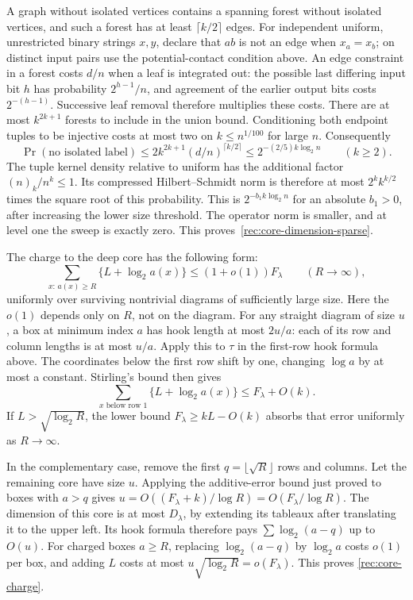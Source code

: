 A graph without isolated vertices contains a spanning forest without
isolated vertices, and such a forest has at least $\lceil k/2\rceil$
edges.  For independent uniform, unrestricted binary strings $x,y$, declare
that $ab$ is not an edge when $x_a=x_b$; on distinct input pairs use
the potential-contact condition above.  An edge constraint in a forest costs $d/n$ when a leaf is integrated out:
the possible last differing input bit $h$ has probability $2^{h-1}/n$,
and agreement of the earlier output bits costs $2^{-(h-1)}$.
Successive leaf removal therefore multiplies these costs.  There are
at most $k^{2k+1}$ forests to include in the union bound.  Conditioning
both endpoint tuples to be injective costs at most two on
$k\le n^{1/100}$ for large $n$.  Consequently
\[
 \Pr(\text{no isolated label})
 \le2k^{2k+1}(d/n)^{\lceil k/2\rceil}
 \le2^{-(2/5)k\log_2n}\qquad(k\ge2).
\]
The tuple kernel density relative to uniform has the additional factor
$(n)_k/n^k\le1$.  Its compressed Hilbert--Schmidt norm is therefore
at most $2^kk^{k/2}$ times the square root of this probability.
This is $2^{-b_1k\log_2n}$ for an absolute $b_1>0$, after increasing
the lower size threshold.  The operator norm is smaller, and at level
one the sweep is exactly zero.  This proves~\eqref{rec:core-dimension-sparse}.

The charge to the deep core has the following form:
\begin{equation}\label{rec:core-charge}
 \sum_{x:\,a(x)\ge R}\{L+\log_2 a(x)\}
 \le(1+o(1))F_\lambda\qquad(R\longrightarrow\infty),
\end{equation}
uniformly over surviving nontrivial diagrams of sufficiently large size.
Here the $o(1)$ depends only on $R$, not on the diagram.
For any straight diagram of size $u$, a box at minimum index $a$ has
hook length at most $2u/a$: each of its row and column lengths is at
most $u/a$.  Apply this to $\tau$ in the first-row hook formula
above.  The coordinates below the first row shift by one, changing
$\log a$ by at most a constant.  Stirling's bound then gives
\[
 \sum_{x\text{ below row }1}\{L+\log_2a(x)\}
 \le F_\lambda+O(k).
\]
If $L>\sqrt{\log_2R}$, the lower bound
$F_\lambda\ge kL-O(k)$ absorbs that error uniformly as $R\to\infty$.

In the complementary case, remove the first
$q=\lfloor\sqrt R\rfloor$ rows and columns.  Let the remaining core
have size $u$.  Applying the additive-error bound just proved to boxes
with $a>q$ gives
$u=O((F_\lambda+k)/\log R)=O(F_\lambda/\log R)$.
The dimension of this core is at most $D_\lambda$, by extending its
tableaux after translating it to the upper left.  Its hook formula
therefore pays $\sum\log_2(a-q)$ up to $O(u)$.
For charged boxes $a\ge R$, replacing $\log_2(a-q)$ by
$\log_2a$ costs $o(1)$ per box, and adding $L$ costs at most
$u\sqrt{\log_2R}=o(F_\lambda)$.  This proves
\eqref{rec:core-charge}.

